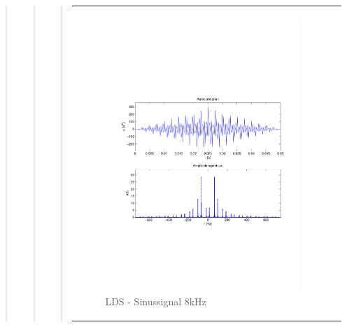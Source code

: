 \begin{quote}
\begin{quote}
\begin{quote}
\begin{center}
\begin{tabular}{ll}
                \begin{minipage}{0.55\textwidth}
                    \begin{figure}[H]
                        \includegraphics[scale=0.4, trim = 1.5cm 7cm 1.5cm 8cm, clip]
                        {./Bilder/sin8_Quantisierungsfehler_LDS}
                          \caption{LDS - Sinussignal 8kHz}
                    \end{figure}
                \end{minipage}
                              

\end{tabular}
\end{center}
\end{quote}
\end{quote}
\end{quote}
